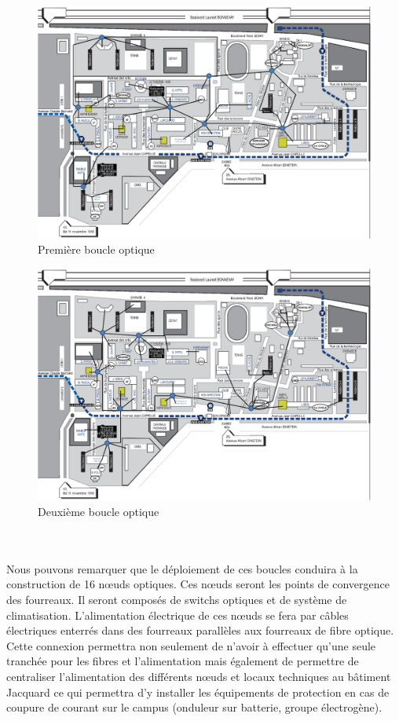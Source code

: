 \begin{figure}[h]
  \caption{\label{Plan_boucle1} Première boucle optique}
  \includegraphics[scale=0.6]{Boucle1.png}
\end{figure}

\begin{figure}[h]
  \caption{\label{Plan_boucle2} Deuxième boucle optique}
  \includegraphics[scale=0.6]{Boucle2.png}
\end{figure}
~\\

\paragraph{} Nous pouvons remarquer que le déploiement de ces boucles conduira à la construction de 16 nœuds optiques. Ces nœuds seront les points de convergence des fourreaux. Il seront composés de switchs optiques et de système de climatisation. L'alimentation électrique de ces nœuds se fera par câbles électriques enterrés dans des fourreaux parallèles aux fourreaux de fibre optique. Cette connexion permettra non seulement de n'avoir à effectuer qu'une seule tranchée pour les fibres et l'alimentation mais également de permettre de centraliser l'alimentation des différents nœuds et locaux techniques au bâtiment Jacquard ce qui permettra d'y installer les équipements de protection en cas de coupure de courant sur le campus (onduleur sur batterie, groupe électrogène).

